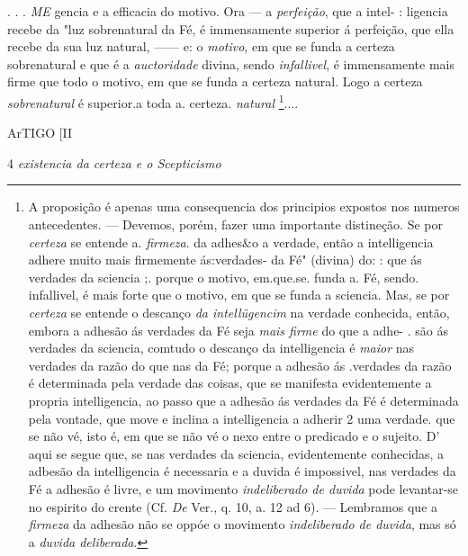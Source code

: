 . . . \emph{ME} gencia e a efficacia do motivo. Ora --- a \emph{perfeição}, que a intel-   : ligencia recebe da "luz sobrenatural da Fé, é immensamente superior á perfeição, que ella recebe da sua luz natural, ------ e: o   \emph{motivo}, em que se funda a certeza sobrenatural e que é a \emph{auctoridade} divina, sendo \emph{infallivel}, é immensamente mais firme que todo o motivo, em que se funda a certeza natural. Logo a certeza \emph{sobrenatural} é superior.a toda a. certeza. \emph{natural} \footnote{A proposição é apenas uma consequencia dos principios expostos nos numeros antecedentes. --- Devemos, porém, fazer uma importante distineção. Se por \emph{certeza} se entende a. \emph{firmeza}. da adhes\&o a verdade, então a intelligencia adhere muito mais firmemente ás:verdades- da Fé" (divina) do: : que ás verdades da sciencia ;. porque o motivo, em.que.se. funda a. Fé, sendo. infallivel, é mais forte que o motivo, em que se funda a sciencia. Mas, se por \emph{certeza} se entende o descanço \emph{da intellügencim} na verdade conhecida, então, embora a adhesão ás verdades da Fé seja \emph{mais firme} do que a adhe- . são ás verdades da sciencia, comtudo o descanço da intelligencia é \emph{maior} nas verdades da razão do que nas da Fé; porque a adhesão ás .verdades da razão é determinada pela verdade das coisas, que se manifesta evidentemente a propria intelligencia, ao passo que a adhesão ás verdades da Fé é determinada pela vontade, que move e inclina a intelligencia a adherir 2 uma verdade. que se não vé, isto é, em que se não vé o nexo entre o predicado e o sujeito. D' aqui se segue que, se nas verdades da sciencia, evidentemente conhecidas, a adbesão da intelligencia é necessaria e a duvida é impossivel, nas verdades da Fé a adhesão é livre, e um movimento \emph{indeliberado de duvida} pode levantar-se no espirito do crente (Cf. \emph{De} Ver., q. 10, a. 12 ad 6). --- Lembramos que a \emph{firmeza} da adhesão não se oppóe o movimento \emph{indeliberado de duvida}, mas só a \emph{duvida deliberada}.}....

ArTIGO [II

4 \emph{existencia da certeza e o Scepticismo}


